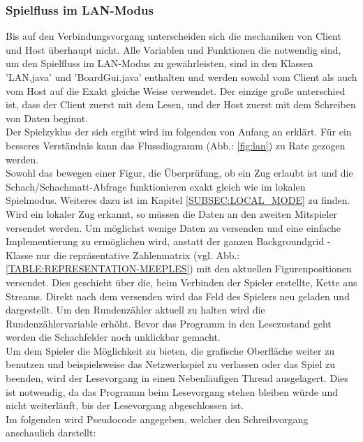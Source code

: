 \documentclass[12pt,a4paper]{article}
\begin{document}
{\begin{lstlisting}
\end{lstlisting}

\subsubsection{Spielfluss im LAN-Modus}

Bis auf den Verbindungsvorgang unterscheiden sich die mechaniken von Client und Host überhaupt nicht. Alle Variablen und Funktionen die notwendig sind, um den Spielfluss im LAN-Modus zu gewährleisten, sind in den Klassen 'LAN.java' und 'BoardGui.java' enthalten und werden sowohl vom Client als auch vom Host auf die Exakt gleiche Weise verwendet. Der einzige große unterschied ist, dass der Client zuerst mit dem Lesen, und der Host zuerst mit dem Schreiben von Daten beginnt. \\
Der Spielzyklus der sich ergibt wird im folgenden von Anfang an erklärt. Für ein besseres Verständnis kann das Flussdiagramm (Abb.: \ref{fig:lan}) zu Rate gezogen werden.\\
Sowohl das bewegen einer Figur, die Überprüfung, ob ein Zug erlaubt ist und die Schach/Schachmatt-Abfrage funktionieren exakt gleich wie im lokalen Spielmodus. Weiteres dazu ist im Kapitel \ref{SUBSEC:LOCAL_MODE} zu finden.\\[2ex]
Wird ein lokaler Zug erkannt, so müssen die Daten an den zweiten Mitspieler versendet werden. Um möglichst wenige Daten zu versenden und eine einfache Implementierung zu ermöglichen wird, anstatt der ganzen Backgroundgrid - Klasse nur die repräsentative Zahlenmatrix (vgl. Abb.: \ref{TABLE:REPRESENTATION-MEEPLES}) mit den aktuellen Figurenpositionen versendet. Dies geschieht über die, beim Verbinden der Spieler erstellte, Kette aus Streams. Direkt nach dem versenden wird das Feld des Spielers neu geladen und dargestellt. Um den Rundenzähler aktuell zu halten wird die Rundenzählervariable erhöht. 
Bevor das Programm in den Lesezustand geht werden die Schachfelder noch unklickbar gemacht.\\[2ex]
Um dem Spieler die Möglichkeit zu bieten, die grafische Oberfläche weiter zu benutzen und beispielsweise das Netzwerkspiel zu verlassen oder das Spiel zu beenden, wird der Lesevorgang in einen Nebenläufigen Thread ausgelagert. Dies ist notwendig, da das Programm beim Lesevorgang stehen bleiben würde und nicht weiterläuft, bis der Lesevorgang abgeschlossen ist.\\
Im folgenden wird Pseudocode angegeben, welcher den Schreibvorgang anschaulich darstellt:

}
\end{document}
